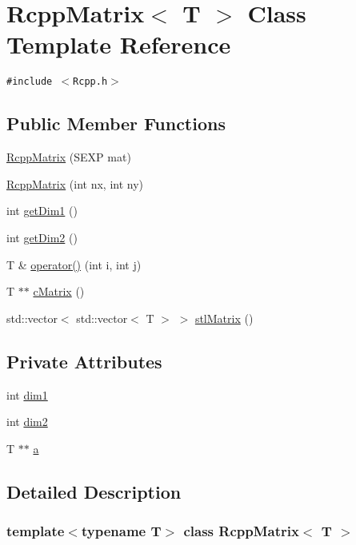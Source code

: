 \hypertarget{classRcppMatrix}{
\section{RcppMatrix$<$ T $>$ Class Template Reference}
\label{classRcppMatrix}
}
{\tt \#include $<$Rcpp.h$>$}

\subsection*{Public Member Functions}
\begin{CompactItemize}
\item 
\hyperlink{classRcppMatrix_6cdd09180c21b504d1455ae2bc8939a7}{RcppMatrix} (SEXP mat)
\item 
\hyperlink{classRcppMatrix_9ac16e2fcccd2a21a33097139e4ec253}{RcppMatrix} (int nx, int ny)
\item 
int \hyperlink{classRcppMatrix_edbe27d643d704a0f5a995821307fdaf}{getDim1} ()
\item 
int \hyperlink{classRcppMatrix_356e04f844e3ebfac29b50e2e749734f}{getDim2} ()
\item 
T \& \hyperlink{classRcppMatrix_7733c87524d7e216f70fc10ccc971a29}{operator()} (int i, int j)
\item 
T $\ast$$\ast$ \hyperlink{classRcppMatrix_e94a95b2125bd594965e26a93c994da4}{cMatrix} ()
\item 
std::vector$<$ std::vector$<$ T $>$ $>$ \hyperlink{classRcppMatrix_e74547edb5d989adb87b2e483153de89}{stlMatrix} ()
\end{CompactItemize}
\subsection*{Private Attributes}
\begin{CompactItemize}
\item 
int \hyperlink{classRcppMatrix_3b2f3ef7c2b482e4f7e7f4f96b787128}{dim1}
\item 
int \hyperlink{classRcppMatrix_d01bc64d89dcc475f7c90f1580bf5d52}{dim2}
\item 
T $\ast$$\ast$ \hyperlink{classRcppMatrix_3f4dad8e2aed525c9b20e98d262ec31e}{a}
\end{CompactItemize}


\subsection{Detailed Description}
\subsubsection*{template$<$typename T$>$ class RcppMatrix$<$ T $>$}



